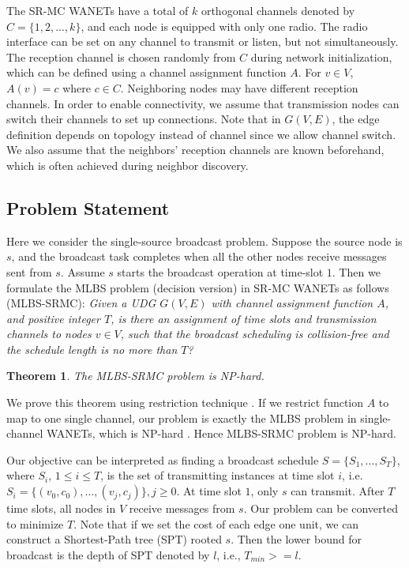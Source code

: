 \documentclass[10pt, conference]{IEEEtran}
\newtheorem{theorem}{Theorem}
\begin{document}
The SR-MC WANETs have a total of $k$ orthogonal channels
denoted by $C=\{1, 2, ..., k\}$, and each node is equipped with
only one radio. The radio interface can be set on any channel
to transmit or listen, but not simultaneously. The reception
channel is chosen randomly from $C$ during network
initialization, which can be defined using a channel assignment
function $A$. For $v \in V$, $A(v) = c$ where $c \in C$.
Neighboring nodes may have different reception channels. In
order to enable connectivity, we assume that transmission nodes
can switch their channels to set up connections. Note
that in $G(V,E)$, the edge definition depends on topology
instead of channel since we allow channel switch. We also
assume that the neighbors' reception channels are known
beforehand, which is often achieved during neighbor discovery.



\subsection{Problem Statement}
Here we consider the single-source broadcast problem. Suppose
the source node is $s$, and the broadcast task completes when
all the other nodes receive messages sent from $s$. Assume $s$
starts the broadcast operation at time-slot $1$. Then we
formulate the MLBS problem (decision version) in SR-MC WANETs
as follows (MLBS-SRMC): \emph{Given a UDG $G(V, E)$ with
channel assignment function $A$, and positive integer $T$, is
there an assignment of time slots and transmission channels to
nodes $v \in V$, such that the broadcast scheduling is
collision-free and the schedule length is no more than $T$?}

\begin{theorem}
The MLBS-SRMC problem is NP-hard.
\end{theorem}
\begin{IEEEproof}
We prove this theorem using restriction technique \cite{NPC}.
If we restrict function $A$ to map to one single
channel, our problem is exactly the MLBS problem in
single-channel WANETs, which is NP-hard \cite{UDG}.
Hence MLBS-SRMC problem is NP-hard.
\end{IEEEproof}

Our objective can be interpreted as finding a broadcast
schedule $S = \{ S_1, ..., S_T \}$, where $S_i$, $1 \leq i \leq
T$, is the set of transmitting instances at time slot $i$, i.e.
$S_i = \{(v_0, c_0), ..., (v_j, c_j)\}, j \geq 0$. At time slot
$1$, only $s$ can transmit. After $T$ time slots, all nodes in
$V$ receive messages from $s$. Our problem can be converted to
minimize $T$. Note that if we set the cost of each edge one
unit, we can construct a Shortest-Path tree (SPT) rooted $s$.
Then the lower bound for broadcast is the depth of SPT denoted
by $l$, i.e., $T_{min} >= l$.
\end{document}
